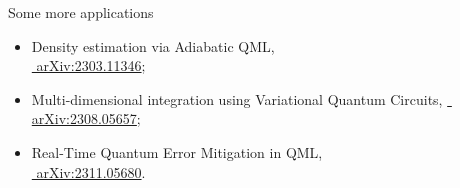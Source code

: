 \documentclass[aspectratio=169, 8pt, xcolor={svgnames}, hyperref={linkcolor=black}]{beamer}
\begin{document}
\begin{frame}{Some more applications}
  \small
  \begin{multicols}{2}
  \begin{itemize}
  \item<2,3,4>[-] Density estimation via Adiabatic QML,\\
  \href{https://arxiv.org/abs/2303.11346}{\faBook\,\,arXiv:2303.11346};
  \item<3,4>[-] Multi-dimensional integration using Variational Quantum Circuits,
  \href{https://arxiv.org/abs/2308.05657}{\faBook\,\,arXiv:2308.05657};
  \item<4>[-] Real-Time Quantum Error Mitigation in QML,\\
  \href{https://arxiv.org/abs/2311.05680}{\faBook\,\,arXiv:2311.05680}.
  \vspace{1cm}
  \end{itemize}
    \begin{figure}
    \end{figure}
    \begin{figure}
    \end{figure}
    \end{multicols}
\end{frame}
\end{document}
